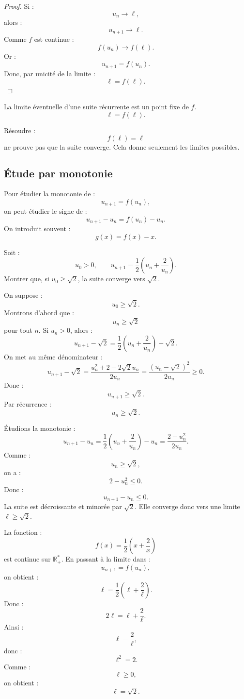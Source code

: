 \documentclass[11pt,a4paper]{article}
\newcommand{\R}{\mathbb R}
\begin{document}
\begin{proof}
Si :
\[
u_n\to\ell,
\]
alors :
\[
u_{n+1}\to\ell.
\]
Comme \(f\) est continue :
\[
f(u_n)\to f(\ell).
\]
Or :
\[
u_{n+1}=f(u_n).
\]
Donc, par unicité de la limite :
\[
\ell=f(\ell).
\]
\end{proof}

\begin{retenirbox}
La limite éventuelle d'une suite récurrente est un point fixe de \(f\).
\[
\ell=f(\ell).
\]
\end{retenirbox}

\begin{erreurbox}
Résoudre :
\[
f(\ell)=\ell
\]
ne prouve pas que la suite converge.  
Cela donne seulement les limites possibles.
\end{erreurbox}

\subsection{Étude par monotonie}

\begin{methodbox}
Pour étudier la monotonie de :
\[
u_{n+1}=f(u_n),
\]
on peut étudier le signe de :
\[
u_{n+1}-u_n=f(u_n)-u_n.
\]
On introduit souvent :
\[
g(x)=f(x)-x.
\]
\end{methodbox}

\begin{exercicebox}
Soit :
\[
u_0>0,
\qquad
u_{n+1}=\frac12\left(u_n+\frac2{u_n}\right).
\]
Montrer que, si \(u_0\geq \sqrt2\), la suite converge vers \(\sqrt2\).
\end{exercicebox}

\begin{correctionbox}
On suppose :
\[
u_0\geq\sqrt2.
\]
Montrons d'abord que :
\[
u_n\geq\sqrt2
\]
pour tout \(n\).  
Si \(u_n>0\), alors :
\[
u_{n+1}-\sqrt2
=
\frac12\left(u_n+\frac2{u_n}\right)-\sqrt2.
\]
On met au même dénominateur :
\[
u_{n+1}-\sqrt2
=
\frac{u_n^2+2-2\sqrt2u_n}{2u_n}
=
\frac{(u_n-\sqrt2)^2}{2u_n}\geq0.
\]
Donc :
\[
u_{n+1}\geq\sqrt2.
\]
Par récurrence :
\[
u_n\geq\sqrt2.
\]

Étudions la monotonie :
\[
u_{n+1}-u_n
=
\frac12\left(u_n+\frac2{u_n}\right)-u_n
=
\frac{2-u_n^2}{2u_n}.
\]
Comme :
\[
u_n\geq\sqrt2,
\]
on a :
\[
2-u_n^2\leq0.
\]
Donc :
\[
u_{n+1}-u_n\leq0.
\]
La suite est décroissante et minorée par \(\sqrt2\).  
Elle converge donc vers une limite \(\ell\geq\sqrt2\).

La fonction :
\[
f(x)=\frac12\left(x+\frac2x\right)
\]
est continue sur \(\R_+^*\).  
En passant à la limite dans :
\[
u_{n+1}=f(u_n),
\]
on obtient :
\[
\ell=\frac12\left(\ell+\frac2\ell\right).
\]
Donc :
\[
2\ell=\ell+\frac2\ell.
\]
Ainsi :
\[
\ell=\frac2\ell,
\]
donc :
\[
\ell^2=2.
\]
Comme :
\[
\ell\geq0,
\]
on obtient :
\[
\ell=\sqrt2.
\]
\end{correctionbox}
\end{document}
